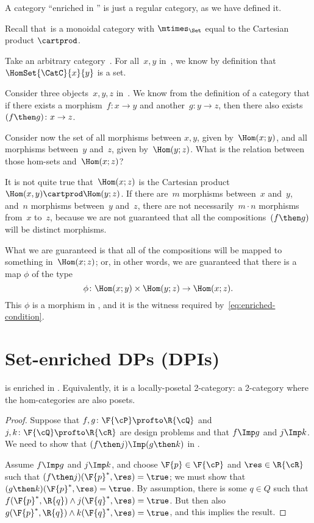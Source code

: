 \begin{example}
  A category ``enriched in \Set'' is just a regular category, as we have defined it.

  Recall that~\Set is a monoidal category with $\mtimes_{\Set}$ equal to the Cartesian product $\cartprod$.

  Take an arbitrary category~\CatC. For all~$x, y$ in~\CatC, we know by definition
  that~$\HomSet{\CatC}{x}{y}$ is a set.

  Consider three objects~$x,y,z$ in~\CatC. We know from the definition of a
  category that if there exists a morphism~$f: x \to y$ and another~$g: y \to z$,
  then there also exists~$(f\then g)\colon x \to z$.

  Consider now the set of all morphisms between $x, y$, given by~$\Hom(x;y)$, and
  all morphisms between~$y$ and~$z$, given by~$\Hom(y; z)$. What is the relation
  between those hom-sets and~$\Hom(x; z)$?

  It is not quite true that~$\Hom(x; z)$ is the Cartesian product~$\Hom(x, y)
  \cartprod \Hom(y; z)$. If there are~$m$ morphisms between~$x$ and~$y$, and~$n$
  morphisms between~$y$ and~$z$, there are not necessarily~$m \cdot n$ morphisms
  from~$x$ to~$z$, because we are not guaranteed that all the compositions~$(f\then g)$
  will be distinct morphisms.

  What we are guaranteed is that all of the compositions will be mapped to something in~$\Hom(x; z)$; or, in other words, we are guaranteed that there
  is a map $\phi$ of the type
  \begin{equation*}
    \phi \colon \Hom(x; y) \times \Hom(y; z) \rightarrow \Hom(x; z).
  \end{equation*}
  This $\phi$ is a morphism in \Set, and it is the witness required by~\cref{eq:enriched-condition}.

\end{example}


\section{Set-enriched DPs (DPIs)}

\begin{proposition}
  \label{prop:DP_loc_pos}
  \DP is enriched in \Pos. Equivalently, it is a locally-posetal 2-category: a 2-category where the hom-categories are also posets.
\end{proposition}
\begin{proof}
  Suppose that $f,g\colon \F{\cP} \profto \R{\cQ}$ and $j,k\colon \F{\cQ} \profto \R{\cR}$ are design problems and that $f\Imp g$ and $j\Imp k$. We need to show that $(f\then j)\Imp(g\then k)$ in \DP.
  \begin{center}
  \end{center}
  Assume $f\Imp g$ and $j\Imp k$, and choose $\F{p}\in\F{\cP} $ and $\res\in\R{\cR}$ such that $(f\then j)(\F{p}^*,\res)=\true$; we must show that $(g \then k)(\F{p}^*,\res)=\true$. By assumption, there is some $q\in Q$ such that $f(\F{p}^*,\R{q})\wedge j(\F{q}^*,\res)=\true$. But then also $g(\F{p}^*,\R{q})\wedge k(\F{q}^*,\res)=\true$, and this implies the result.
\end{proof}

